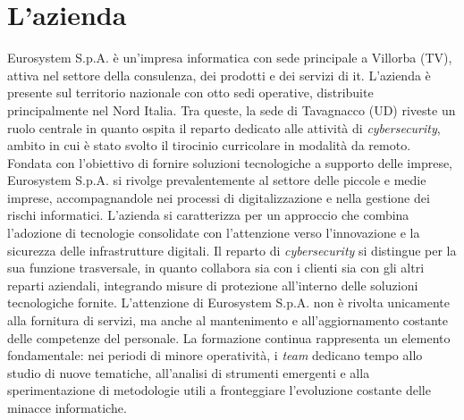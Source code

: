 \section{L'azienda}
Eurosystem S.p.A. è un'impresa informatica con sede principale a Villorba (TV), attiva nel settore della consulenza, dei prodotti e dei servizi di \gls{it}. L'azienda è presente sul territorio nazionale con otto sedi operative, distribuite principalmente nel Nord Italia. Tra queste, la sede di Tavagnacco (UD) riveste un ruolo centrale in quanto ospita il reparto dedicato alle attività di \textit{cybersecurity}, ambito in cui è stato svolto il tirocinio curricolare in modalità da remoto.  
Fondata con l'obiettivo di fornire soluzioni tecnologiche a supporto delle imprese, Eurosystem S.p.A. si rivolge prevalentemente al settore delle piccole e medie imprese, accompagnandole nei processi di digitalizzazione e nella gestione dei rischi informatici. L'azienda si caratterizza per un approccio che combina l'adozione di tecnologie consolidate con l'attenzione verso l'innovazione e la sicurezza delle infrastrutture digitali.  
Il reparto di \textit{cybersecurity} si distingue per la sua funzione trasversale, in quanto collabora sia con i clienti sia con gli altri reparti aziendali, integrando misure di protezione all'interno delle soluzioni tecnologiche fornite.  
L'attenzione di Eurosystem S.p.A. non è rivolta unicamente alla fornitura di servizi, ma anche al mantenimento e all'aggiornamento costante delle competenze del personale. La formazione continua rappresenta un elemento fondamentale: nei periodi di minore operatività, i \textit{team} dedicano tempo allo studio di nuove tematiche, all'analisi di strumenti emergenti e alla sperimentazione di metodologie utili a fronteggiare l'evoluzione costante delle minacce informatiche.  